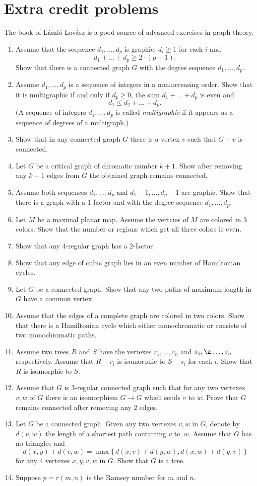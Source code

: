 \chapter{Extra credit problems}

The book of L\'aszl\'o Lov\'asz \cite{lovasz} is a good source of advanced exercises in graph theory.

\begin{enumerate}
\item Assume that the sequence $d_1,\dots, d_p$ is graphic,
$d_i\ge 1$ for each $i$ and 
\[d_1+\dots+d_p\ge 2\cdot(p-1).\]
Show that there is a connected graph $G$ with the degree sequence $d_1,\dots, d_p$.
\item Assume $d_1,\dots, d_p$ is a sequence of integers in a nonincreasing order.
Show that it is multigraphic if and only if $d_p\ge0$, the sum $d_1+\dots+ d_p$ is even and 
\[d_1\le d_2+\dots+d_p.\]
(A sequence of integers $d_1,\dots, d_p$ is called \textit{multigraphic} if it appears as a sequence of degrees of a multigraph.)
\item Show that in any connected graph $G$ there is a vertex $v$ such that $G-v$ is connected.
\item Let $G$ be a critical graph of chromatic number $k+1$.
Show after removing any $k-1$ edges from $G$  
the obtained graph remains connected. 
\item Assume both sequences $d_1,\dots, d_p$
 and $d_1-1,\dots, d_p-1$ are graphic.
Show that there is a graph with a 1-factor and with the degree sequence $d_1,\dots, d_p$.
\item Let $M$ be a maximal planar map.
Assume the vertcies of $M$ are colored in 3 colors.
Show that the number or regions which get all three colors is even.
\item Show that any $4$-regular graph has a $2$-factor.
\item Show that any edge of cubic graph lies in an even number of Hamiltonian cycles.
\item Let $G$ be a  connected graph.
Show that any two paths of maximum length in $G$ have a common vertex.
\item Assume that the edges of a complete graph are colored in two colors.
Show that there is a Hamiltonian cycle which either monochromatic or consists of two monochromatic paths.
\item Assume two trees $R$ and $S$ 
have the vertexes $r_1,\dots,r_n$ and $s_1,\z\dots,s_n$ respectively.
Assume that $R-r_i$ is isomorphic to $S-s_i$ for each $i$.
Show that $R$ is isomorphic to $S$.
\item Assume that $G$ is $3$-regular connected graph such that 
for any two vertexes $v,w$ of $G$ there is an isomorphism
$G\to G$ which sends $v$ to $w$.
Prove that $G$ remains connected after removing any $2$ edges.
\item  Let $G$ be a connected graph.
Given any two vertexes $v,w$ in $G$, denote by $d(v,w)$ the length of a shortest path containing $v$ to~$w$. 
Assume that $G$ has no triangles and
\[d(x,y)+d(v,w)=\max\{\,d(x,v)+d(y,w),d(x,w)+d(y,v)\,\}\]
for any 4 vertexes $x,y,v,w$ in $G$.
Show that $G$ is a tree.
\item Suppose $p=r(m,n)$ is the Ramsey number for $m$ and $n$.


\end{enumerate}

